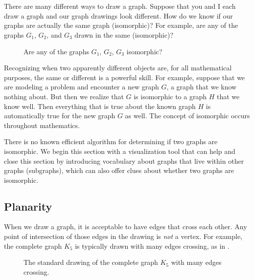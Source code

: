 \section{\secsubgraphiso}
\label{sec_subgraph_isomorphic}

There are many different ways to draw a graph.  Suppose that you and I each draw a graph and our graph drawings look different.  How do we know if our graphs are actually the same graph (isomorphic)?  For example, are any of the graphs $G_1$, $G_2$, and $G_3$ drawn in  the same (isomorphic)? 

    \begin{figure}[hbtp]
        \centering
        
        \caption{Are any of the graphs $G_1$, $G_2$, $G_3$ isomorphic?}
        \label{fig_G1G2G3}
    \end{figure}    

Recognizing when two apparently different objects are, for all mathematical purposes, the same or different is a powerful skill.  For example, suppose that we are modeling a problem and encounter a new graph $G$, a graph that we know nothing about.  But then we realize that $G$ is isomorphic to a graph $H$ that we know well.  Then everything that is true about the known graph $H$ is automatically true for the new graph $G$ as well.  The concept of isomorphic occurs throughout mathematics.  

There is no known efficient algorithm for determining if two graphs are isomorphic.  We begin this section with a visualization tool that can help and close this section by introducing vocabulary about graphs that live within other graphs (subgraphs), which can also offer clues about whether two graphs are isomorphic.


\newcommand{\subplanarity}{Planarity}
\subsection{\subplanarity}
\label{sub_planarity}

When we draw a graph, it is acceptable to have edges that cross each other.  Any point of intersection of those edges in the drawing is \emph{not} a vertex.  For example, the complete graph $K_5$ is typically drawn with many edges crossing, as in .

\begin{figure}
    \centering
    
    \caption{The standard drawing of the complete graph $K_5$ with many edges crossing.}
    \label{fig_K5}
\end{figure}

